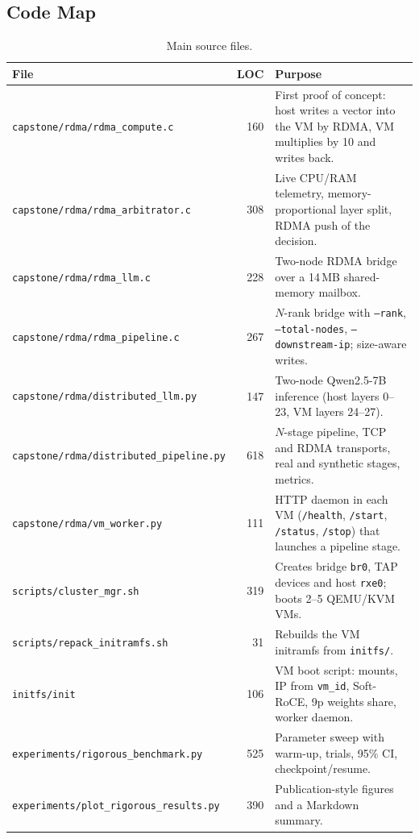 \documentclass[11pt,a4paper]{article}
\begin{document}
\subsection{Code Map}
\begin{table}[h]
\centering
\small
\begin{tabularx}{\linewidth}{@{}lrX@{}}
\toprule
File & LOC & Purpose \\
\midrule
\texttt{capstone/rdma/rdma\_compute.c} & 160 & First proof of concept: host writes a vector into the VM by RDMA, VM multiplies by 10 and writes back. \\
\texttt{capstone/rdma/rdma\_arbitrator.c} & 308 & Live CPU/RAM telemetry, memory-proportional layer split, RDMA push of the decision. \\
\texttt{capstone/rdma/rdma\_llm.c} & 228 & Two-node RDMA bridge over a 14\,MB shared-memory mailbox. \\
\texttt{capstone/rdma/rdma\_pipeline.c} & 267 & $N$-rank bridge with \texttt{--rank}, \texttt{--total-nodes}, \texttt{--downstream-ip}; size-aware writes. \\
\texttt{capstone/rdma/distributed\_llm.py} & 147 & Two-node Qwen2.5-7B inference (host layers 0--23, VM layers 24--27). \\
\texttt{capstone/rdma/distributed\_pipeline.py} & 618 & $N$-stage pipeline, TCP and RDMA transports, real and synthetic stages, metrics. \\
\texttt{capstone/rdma/vm\_worker.py} & 111 & HTTP daemon in each VM (\texttt{/health}, \texttt{/start}, \texttt{/status}, \texttt{/stop}) that launches a pipeline stage. \\
\texttt{scripts/cluster\_mgr.sh} & 319 & Creates bridge \texttt{br0}, TAP devices and host \texttt{rxe0}; boots 2--5 QEMU/KVM VMs. \\
\texttt{scripts/repack\_initramfs.sh} & 31 & Rebuilds the VM initramfs from \texttt{initfs/}. \\
\texttt{initfs/init} & 106 & VM boot script: mounts, IP from \texttt{vm\_id}, Soft-RoCE, 9p weights share, worker daemon. \\
\texttt{experiments/rigorous\_benchmark.py} & 525 & Parameter sweep with warm-up, trials, 95\% CI, checkpoint/resume. \\
\texttt{experiments/plot\_rigorous\_results.py} & 390 & Publication-style figures and a Markdown summary. \\
\bottomrule
\end{tabularx}
\caption{Main source files.}
\end{table}
\end{document}
